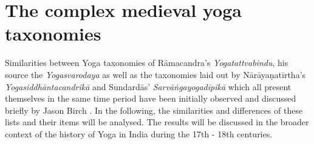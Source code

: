\chapter{The complex medieval yoga taxonomies}
\label{yogas_list}

Similarities between Yoga taxonomies of Rāmacandra's \textit{Yogatattvabindu}, his source the \textit{Yogasvarodaya} as well as the taxonomies laid out by Nārāyaṇatīrtha's \textit{Yogasiddhāntacandrikā} and Sundardās' \textit{Sarvāṅgayogadīpikā} which all present themselves in the same time period have been initially observed and discussed briefly by Jason Birch \parencite[415-416]{birch2014}. In the following, the similarities and differences of these lists and their items will be analysed. The results will be discussed in the broader context of the history of Yoga in India during the 17th - 18th centuries.

